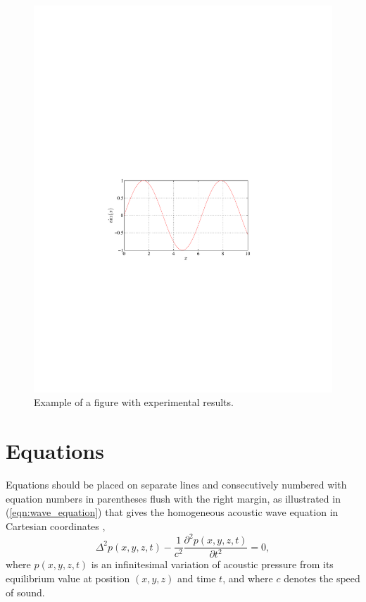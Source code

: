 \documentclass{article}
\begin{document}
\begin{sloppy}
\begin{figure}[t]
  \centering
  \centerline{\includegraphics[width=\columnwidth]{fig1a}}
  \caption{Example of a figure with experimental results.}
  \label{fig:results}
\end{figure}

\section{Equations}
\label{sec:equations}

Equations should be placed on separate lines and consecutively
numbered with equation numbers in parentheses flush with the 
right margin, as illustrated in (\ref{eqn:wave_equation}) 
that gives the homogeneous acoustic wave equation in
Cartesian coordinates \cite{eWilliams1999},
\begin{equation}
  \label{eqn:wave_equation}
    \Delta^2p(x,y,z,t)-
    \displaystyle\frac{1}{c^2}\frac{\partial^2p(x,y,z,t)}{\partial t^2}=0,
\end{equation}
where $p(x,y,z,t)$ is an infinitesimal variation of acoustic 
pressure from its equilibrium value at position $(x,y,z)$ and 
time $t$, and where $c$ denotes the speed of sound.


\end{sloppy}
\end{document}
